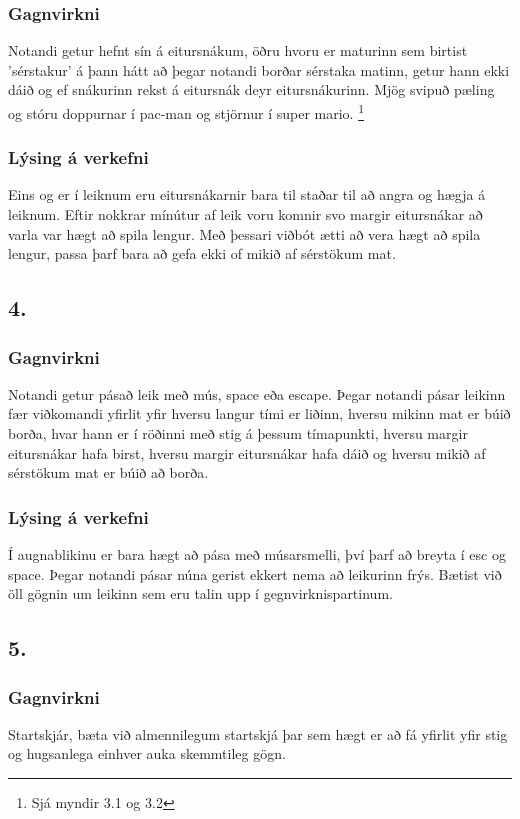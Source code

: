 \documentclass{article}
\begin{document}
\subsubsection*{Gagnvirkni}
Notandi getur hefnt sín á eitursnákum, öðru hvoru er maturinn sem birtist 'sérstakur'
á þann hátt að þegar notandi borðar sérstaka matinn, 
getur hann ekki dáið og ef snákurinn rekst á eitursnák deyr eitursnákurinn.
Mjög svipuð pæling og stóru doppurnar í pac-man og stjörnur í super mario.
\footnote{Sjá myndir 3.1 og 3.2}

\subsubsection*{Lýsing á verkefni}
Eins og er í leiknum eru eitursnákarnir bara til staðar til að angra og hægja á leiknum.
Eftir nokkrar mínútur af leik voru komnir svo margir eitursnákar að varla var hægt að spila lengur.
Með þessari viðbót ætti að vera hægt að spila lengur, passa þarf bara að gefa ekki of mikið af sérstökum mat.

\subsection*{4.}
\subsubsection*{Gagnvirkni}
Notandi getur pásað leik með mús, space eða escape. 
Þegar notandi pásar leikinn fær viðkomandi yfirlit yfir hversu langur tími er liðinn,
hversu mikinn mat er búið borða, hvar hann er í röðinni með stig á þessum tímapunkti, 
hversu margir eitursnákar hafa birst, hversu margir eitursnákar hafa dáið og hversu mikið af sérstökum mat er búið að borða.

\subsubsection*{Lýsing á verkefni}
Í augnablikinu er bara hægt að pása með músarsmelli, því þarf að breyta í esc og space. 
Þegar notandi pásar núna gerist ekkert nema að leikurinn frýs. Bætist við öll gögnin um leikinn sem eru talin upp í gegnvirknispartinum.

\subsection*{5.}
\subsubsection*{Gagnvirkni}
Startskjár, 
bæta við almennilegum startskjá þar sem hægt er að fá yfirlit yfir stig 
og hugsanlega einhver auka skemmtileg gögn.
\end{document}

